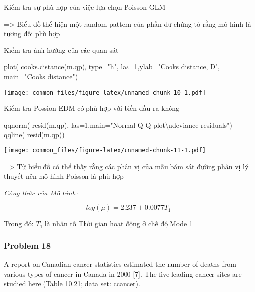 \documentclass[
]{article}
\newenvironment{Shaded}{\begin{snugshade}}{\end{snugshade}}
\newcommand{\AttributeTok}[1]{\textcolor[rgb]{0.77,0.63,0.00}{#1}}
\newcommand{\DecValTok}[1]{\textcolor[rgb]{0.00,0.00,0.81}{#1}}
\newcommand{\FunctionTok}[1]{\textcolor[rgb]{0.00,0.00,0.00}{#1}}
\newcommand{\NormalTok}[1]{#1}
\newcommand{\SpecialCharTok}[1]{\textcolor[rgb]{0.00,0.00,0.00}{#1}}
\newcommand{\StringTok}[1]{\textcolor[rgb]{0.31,0.60,0.02}{#1}}
\begin{document}
Kiểm tra sự phù hợp của việc lựa chọn Poisson GLM

=\textgreater{} Biểu đồ thể hiện một random pattern của phần dư chứng tỏ
rằng mô hình là tương đối phù hợp

Kiểm tra ảnh hưởng của các quan sát

\begin{Shaded}
\begin{Highlighting}[]
\FunctionTok{plot}\NormalTok{( }\FunctionTok{cooks.distance}\NormalTok{(m.qp), }\AttributeTok{type=}\StringTok{"h"}\NormalTok{, }\AttributeTok{las=}\DecValTok{1}\NormalTok{,}\AttributeTok{ylab=}\StringTok{"Cook\textquotesingle{}s distance, D"}\NormalTok{, }\AttributeTok{main=}\StringTok{"Cook\textquotesingle{}s distance"}\NormalTok{)}
\end{Highlighting}
\end{Shaded}

\texttt{[image: common\_files/figure-latex/unnamed-chunk-10-1.pdf]}

Kiểm tra Possion EDM có phù hợp với biến đầu ra không

\begin{Shaded}
\begin{Highlighting}[]
\FunctionTok{qqnorm}\NormalTok{( }\FunctionTok{resid}\NormalTok{(m.qp), }\AttributeTok{las=}\DecValTok{1}\NormalTok{,}\AttributeTok{main=}\StringTok{"Normal Q{-}Q plot}\SpecialCharTok{\textbackslash{}n}\StringTok{deviance residuals"}\NormalTok{)}
\FunctionTok{qqline}\NormalTok{( }\FunctionTok{resid}\NormalTok{(m.qp))}
\end{Highlighting}
\end{Shaded}

\texttt{[image: common\_files/figure-latex/unnamed-chunk-11-1.pdf]}

=\textgreater{} Từ biểu đồ có thể thấy rằng các phân vị của mẫu bám sát
đường phân vị lý thuyết nên mô hình Poisson là phù hợp

\emph{Công thức của Mô hình:}

\[
log(\mu) = 2.237 + 0.0077T_{1}
\]

Trong đó: \(T_{1}\) là nhân tố Thời gian hoạt động ở chế độ Mode 1

\hypertarget{problem-18}{%
\subsubsection{Problem 18}\label{problem-18}}

A report on Canadian cancer statistics estimated the number of deaths
from various types of cancer in Canada in 2000 {[}7{]}. The ﬁve leading
cancer sites are studied here (Table 10.21; data set: ccancer).
\end{document}

